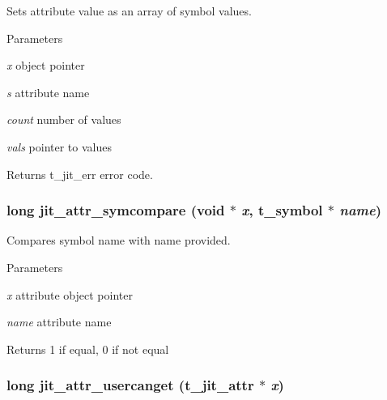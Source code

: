 Sets attribute value as an array of symbol values. 
\begin{DoxyParams}{Parameters}
\item[{\em x}]object pointer \item[{\em s}]attribute name \item[{\em count}]number of values \item[{\em vals}]pointer to values\end{DoxyParams}
\begin{DoxyReturn}{Returns}
t\_\-jit\_\-err error code. 
\end{DoxyReturn}
\hypertarget{group__attrmod_ga86b458f3e1b105baa95cd7daa380d8f4}{
\subsubsection[{jit\_\-attr\_\-symcompare}]{\setlength{\rightskip}{0pt plus 5cm}long jit\_\-attr\_\-symcompare (void $\ast$ {\em x}, \/  {\bf t\_\-symbol} $\ast$ {\em name})}}
\label{group__attrmod_ga86b458f3e1b105baa95cd7daa380d8f4}


Compares symbol name with name provided. 
\begin{DoxyParams}{Parameters}
\item[{\em x}]attribute object pointer \item[{\em name}]attribute name\end{DoxyParams}
\begin{DoxyReturn}{Returns}
1 if equal, 0 if not equal 
\end{DoxyReturn}
\hypertarget{group__attrmod_ga5c71cda4f1df64ec56442be1a7278c99}{
\subsubsection[{jit\_\-attr\_\-usercanget}]{\setlength{\rightskip}{0pt plus 5cm}long jit\_\-attr\_\-usercanget ({\bf t\_\-jit\_\-attr} $\ast$ {\em x})}}
\label{group__attrmod_ga5c71cda4f1df64ec56442be1a7278c99}


